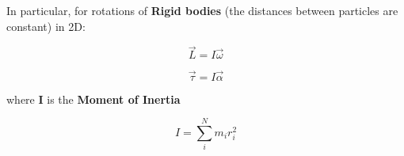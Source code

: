 \documentclass[]{beamer}
\begin{document}
\begin{frame}

In particular, for rotations of \textbf{ Rigid bodies} (the distances between particles are constant) in 2D:

\pause

\begin{equation}
 \vec{L}=I\vec{\omega }
\end{equation}

\begin{equation}
  \vec{\tau}= I\vec{\alpha }
 \end{equation}
  
 \pause
 where $\textbf{I}$ is the \textbf{Moment of Inertia }

 \begin{equation}
I=\sum^N_i m_i r^2_i
 \end{equation}
  
\end{frame}
\end{document}
